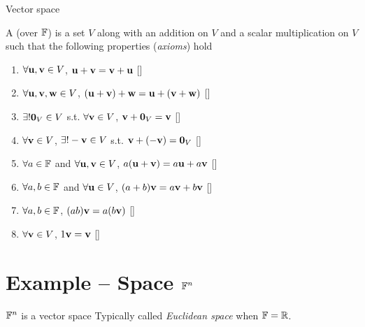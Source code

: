 \documentclass[aspectratio=169]{beamer}
\begin{document}
\begin{frame}{Vector space}
\begin{definition}
A  (over $\mathbb{F}$) is a set $V$ along with an addition on $V$ and a scalar multiplication on $V$ such that the following properties (\emph{axioms}) hold
\begin{enumerate}
\item $\forall \mathbf{u},\mathbf{v}\in V$, $\mathbf{u}+\mathbf{v}=\mathbf{v}+\mathbf{u}$  \hfill[]
\item $\forall \mathbf{u},\mathbf{v},\mathbf{w}\in V$, $(\mathbf{u}+\mathbf{v})+\mathbf{w}=\mathbf{u}+(\mathbf{v}+\mathbf{w})$ \hfill[]
\item $\exists!\b0_V\in V$ s.t. $\forall \mathbf{v}\in V$, $\bv+\b0_V=\bv$ \hfill[]
\item $\forall \mathbf{v}\in V$, $\exists!-\mathbf{v}\in V$ s.t. $\bv+(-\bv)=\b0_V$ \hfill[]
\item $\forall a\in\mathbb{F}$ and $\forall \mathbf{u},\mathbf{v}\in V$, $a(\mathbf{u}+\mathbf{v})=a\mathbf{u}+a\mathbf{v}$ \hfill[]
\item $\forall a,b\in\mathbb{F}$ and $\forall \mathbf{u}\in V$, $(a+b)\mathbf{v}=a\mathbf{v}+b\mathbf{v}$ \hfill[]
\item $\forall a,b\in\mathbb{F}$, $(ab)\mathbf{v}=a(b\mathbf{v})$ \hfill[]
\item $\forall \mathbf{v}\in V$, $1\mathbf{v}=\mathbf{v}$ \hfill[]
\end{enumerate}
\end{definition}
\end{frame}
            



\section{Example -- Space $\mathbb{F}^n$}

\begin{frame}{$\mathbb{F}^n$ is a vector space}
Typically called \emph{Euclidean space} when $\mathbb{F}=\mathbb{R}$.
\end{frame}
\end{document}
